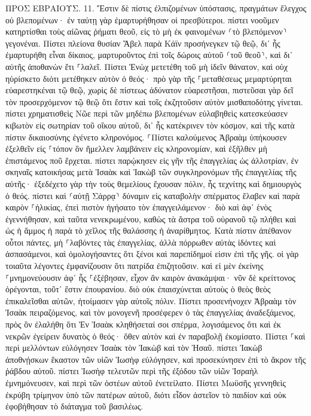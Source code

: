 \documentclass[twoside, 9pt]{extreport}
\begin{document}
ΠΡΟΣ ΕΒΡΑΙΟΥΣ.
11.
Ἔστιν δὲ πίστις ἐλπιζομένων ὑπόστασις, πραγμάτων ἔλεγχος οὐ βλεπομένων· 
ἐν ταύτῃ γὰρ ἐμαρτυρήθησαν οἱ πρεσβύτεροι. 
πίστει νοοῦμεν κατηρτίσθαι τοὺς αἰῶνας ῥήματι θεοῦ, εἰς τὸ μὴ ἐκ φαινομένων ⸂τὸ βλεπόμενον⸃ γεγονέναι. 
Πίστει πλείονα θυσίαν Ἅβελ παρὰ Κάϊν προσήνεγκεν τῷ θεῷ, δι᾽ ἧς ἐμαρτυρήθη εἶναι δίκαιος, μαρτυροῦντος ἐπὶ τοῖς δώροις αὐτοῦ ⸂τοῦ θεοῦ⸃, καὶ δι᾽ αὐτῆς ἀποθανὼν ἔτι ⸀λαλεῖ. 
Πίστει Ἑνὼχ μετετέθη τοῦ μὴ ἰδεῖν θάνατον, καὶ οὐχ ηὑρίσκετο διότι μετέθηκεν αὐτὸν ὁ θεός· πρὸ γὰρ τῆς ⸀μεταθέσεως μεμαρτύρηται εὐαρεστηκέναι τῷ θεῷ, 
χωρὶς δὲ πίστεως ἀδύνατον εὐαρεστῆσαι, πιστεῦσαι γὰρ δεῖ τὸν προσερχόμενον τῷ θεῷ ὅτι ἔστιν καὶ τοῖς ἐκζητοῦσιν αὐτὸν μισθαποδότης γίνεται. 
πίστει χρηματισθεὶς Νῶε περὶ τῶν μηδέπω βλεπομένων εὐλαβηθεὶς κατεσκεύασεν κιβωτὸν εἰς σωτηρίαν τοῦ οἴκου αὐτοῦ, δι᾽ ἧς κατέκρινεν τὸν κόσμον, καὶ τῆς κατὰ πίστιν δικαιοσύνης ἐγένετο κληρονόμος. 
⸀Πίστει καλούμενος Ἀβραὰμ ὑπήκουσεν ἐξελθεῖν εἰς ⸀τόπον ὃν ἤμελλεν λαμβάνειν εἰς κληρονομίαν, καὶ ἐξῆλθεν μὴ ἐπιστάμενος ποῦ ἔρχεται. 
πίστει παρῴκησεν εἰς γῆν τῆς ἐπαγγελίας ὡς ἀλλοτρίαν, ἐν σκηναῖς κατοικήσας μετὰ Ἰσαὰκ καὶ Ἰακὼβ τῶν συγκληρονόμων τῆς ἐπαγγελίας τῆς αὐτῆς· 
ἐξεδέχετο γὰρ τὴν τοὺς θεμελίους ἔχουσαν πόλιν, ἧς τεχνίτης καὶ δημιουργὸς ὁ θεός. 
πίστει καὶ ⸂αὐτῇ Σάρρᾳ⸃ δύναμιν εἰς καταβολὴν σπέρματος ἔλαβεν καὶ παρὰ καιρὸν ⸀ἡλικίας, ἐπεὶ πιστὸν ἡγήσατο τὸν ἐπαγγειλάμενον· 
διὸ καὶ ἀφ᾽ ἑνὸς ἐγεννήθησαν, καὶ ταῦτα νενεκρωμένου, καθὼς τὰ ἄστρα τοῦ οὐρανοῦ τῷ πλήθει καὶ ὡς ἡ ἄμμος ἡ παρὰ τὸ χεῖλος τῆς θαλάσσης ἡ ἀναρίθμητος. 
Κατὰ πίστιν ἀπέθανον οὗτοι πάντες, μὴ ⸀λαβόντες τὰς ἐπαγγελίας, ἀλλὰ πόρρωθεν αὐτὰς ἰδόντες καὶ ἀσπασάμενοι, καὶ ὁμολογήσαντες ὅτι ξένοι καὶ παρεπίδημοί εἰσιν ἐπὶ τῆς γῆς. 
οἱ γὰρ τοιαῦτα λέγοντες ἐμφανίζουσιν ὅτι πατρίδα ἐπιζητοῦσιν. 
καὶ εἰ μὲν ἐκείνης ⸀μνημονεύουσιν ἀφ᾽ ἧς ⸀ἐξέβησαν, εἶχον ἂν καιρὸν ἀνακάμψαι· 
νῦν δὲ κρείττονος ὀρέγονται, τοῦτ᾽ ἔστιν ἐπουρανίου. διὸ οὐκ ἐπαισχύνεται αὐτοὺς ὁ θεὸς θεὸς ἐπικαλεῖσθαι αὐτῶν, ἡτοίμασεν γὰρ αὐτοῖς πόλιν. 
Πίστει προσενήνοχεν Ἀβραὰμ τὸν Ἰσαὰκ πειραζόμενος, καὶ τὸν μονογενῆ προσέφερεν ὁ τὰς ἐπαγγελίας ἀναδεξάμενος, 
πρὸς ὃν ἐλαλήθη ὅτι Ἐν Ἰσαὰκ κληθήσεταί σοι σπέρμα, 
λογισάμενος ὅτι καὶ ἐκ νεκρῶν ἐγείρειν δυνατὸς ὁ θεός· ὅθεν αὐτὸν καὶ ἐν παραβολῇ ἐκομίσατο. 
Πίστει ⸀καὶ περὶ μελλόντων εὐλόγησεν Ἰσαὰκ τὸν Ἰακὼβ καὶ τὸν Ἠσαῦ. 
πίστει Ἰακὼβ ἀποθνῄσκων ἕκαστον τῶν υἱῶν Ἰωσὴφ εὐλόγησεν, καὶ προσεκύνησεν ἐπὶ τὸ ἄκρον τῆς ῥάβδου αὐτοῦ. 
πίστει Ἰωσὴφ τελευτῶν περὶ τῆς ἐξόδου τῶν υἱῶν Ἰσραὴλ ἐμνημόνευσεν, καὶ περὶ τῶν ὀστέων αὐτοῦ ἐνετείλατο. 
Πίστει Μωϋσῆς γεννηθεὶς ἐκρύβη τρίμηνον ὑπὸ τῶν πατέρων αὐτοῦ, διότι εἶδον ἀστεῖον τὸ παιδίον καὶ οὐκ ἐφοβήθησαν τὸ διάταγμα τοῦ βασιλέως. 
\end{document}

